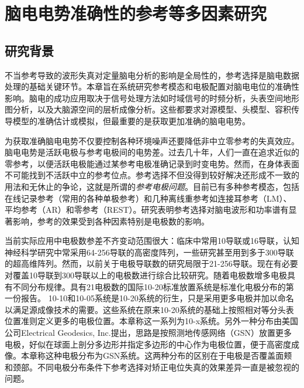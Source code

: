 \chapter{脑电电势准确性的参考等多因素研究}
\section{研究背景}
不当参考导致的波形失真对定量脑电分析的影响是全局性的，参考选择是脑电数据处理的基础关键环节。本章旨在系统研究参考模态和电极配置对脑电电位的准确性影响。脑电的成功应用取决于信号处理方法如时域信号的时频分析，头表空间地形图分析，以及大脑源空间的层析成像分析。这些都要求对源模型、头模型、容积传导模型的准确估计或模拟，但最重要的是获取更加准确的脑电电势。

为获取准确脑电电势不仅要控制各种环境噪声还要降低非中立零参考的失真效应。脑电电势是活跃电极与参考电极间的电势差。过去几十年，人们一直在追求近似的零参考，以便活跃电极能通过某参考电极准确记录到时变电势。然而，在身体表面不可能找到不活跃中立的参考位点。参考选择不但没得到较好解决还形成不一致的用法和无休止的争论，这就是所谓的\textit{参考电极问题}。目前已有多种参考模态，包括在线记录参考（常用的各种单极参考）和几种离线重参考如连接耳参考（LM）、平均参考（AR）和零参考（REST）。研究表明参考选择对脑电波形和功率谱有显著影响，参考的效果受到各种因素特别是电极数的影响。

当前实际应用中电极数参差不齐变动范围很大：临床中常用10导联或16导联，认知神经科学研究中常采用64-256导联的高密度阵列，一些研究甚至用到多于300导联的超高维阵列。然而，以前关于电极导联数的研究局限于21-256导联。现在有必要对覆盖10导联到300导联以上的电极数进行综合比较研究。随着电极数增多电极具有不同分布规律。具有21电极数的国际10-20标准放置系统是标准化电极分布的第一份报告。 10-10和10-05系统是10-20系统的衍生，只是采用更多电极并加以命名以满足源成像技术的需要。这些系统在原来10-20系统的基础上按照相对等分头表位置准则定义更多的电极位置。本章称这一系列为10-x系统。另外一种分布由美国公司Electrical Geodesics, Inc.提出，思路是按照测地传感网络（GSN）放置更多电极，好似在球面上剖分多边形并指定多边形的中心作为电极位置，便于高密度成像。本章称这种电极分布为GSN系统。这两种分布的区别在于电极是否覆盖面颊和颈部。不同电极分布条件下参考选择对矫正电位失真的效果差异一直是被忽视的问题。

